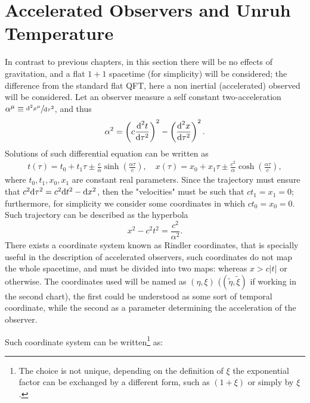 \section{Accelerated Observers and Unruh Temperature}
In contrast to previous chapters, in this section there will be no effects of gravitation, and a flat $1+1$ spacetime (for simplicity) will be considered; the difference from the standard flat QFT, here a non inertial (accelerated) observed will be considered. Let an observer measure a self constant two-acceleration $\alpha^\mu\equiv \sfrac{\text{d}^2 x^\mu}{\text{d}\tau^2}$, and thus
\begin{equation}
	\alpha^2=\left(c\frac{\text{d}^2 t}{\text{d}\tau^2}\right)^2-\left(\frac{\text{d}^2x}{\text{d}\tau^2}\right)^2.
\end{equation}
Solutions of such differential equation can be written as
\begin{subequations}
	\begin{gather}
		t(\tau)=t_0+t_1\tau\pm\frac{c}{\alpha}\sinh\left(\frac{\alpha\tau}{c}\right),\quad x(\tau)=x_0+x_1\tau\pm\frac{c^2}{\alpha}\cosh\left(\frac{\alpha\tau}{c}\right),\tag{\theequation \,\,a,b}
	\end{gather}
\end{subequations}
where $t_0,t_1,x_0,x_1$ are constant real parameters. Since the trajectory must ensure that $c^2\text{d}\tau^2=c^2\text{d} t^2-\text{d} x^2$, then the "velocities" must be such that $ct_1=x_1=0$; furthermore, for simplicity we consider some coordinates in which $ct_0=x_0=0$. Such trajectory can be described as the hyperbola
\begin{equation}
	x^2-c^2t^2=\frac{c^2}{\alpha^2}.
\end{equation}
There exists a coordinate system known as Rindler coordinates, that is specially useful in the description of accelerated observers, such coordinates do not map the whole spacetime, and must be divided into two maps: whereas $x>c|t|$ or otherwise. The coordinates used will be named as $(\eta,\xi)$ ($(\tilde\eta,\tilde\xi)$ if working in the second chart), the first could be understood as some sort of temporal coordinate, while the second as a parameter determining the acceleration of the observer.
\begin{wrapfigure}[13]{r}{0.49\textwidth}
\end{wrapfigure}
Such coordinate system can be written\footnote{The choice is not unique, depending on the definition of $\xi$ the exponential factor can be exchanged by a different form, such as $(1+\xi)$ or simply by $\xi$.} as:

